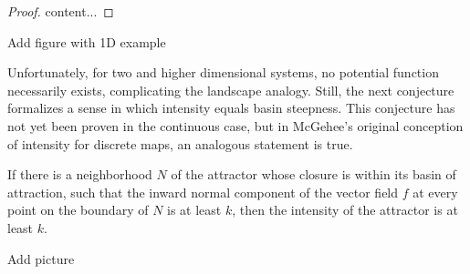 \begin{proof}
	content...
\end{proof}

Add figure with 1D example

Unfortunately, for two and higher dimensional systems, no potential function necessarily exists, complicating the landscape analogy. Still, the next conjecture formalizes a sense in which intensity equals basin steepness. This conjecture has not yet been proven in the continuous case, but in McGehee's original conception of intensity for discrete maps, an analogous statement is true. %

\begin{conjecture}
	\label{conj:steepness}
	If there is a neighborhood $N$ of the attractor whose closure is within its basin of attraction, such that the inward normal component of the vector field $f$ at every point on the boundary of $N$ is at least $k$, then the intensity of the attractor is at least $k$.
\end{conjecture}


Add picture